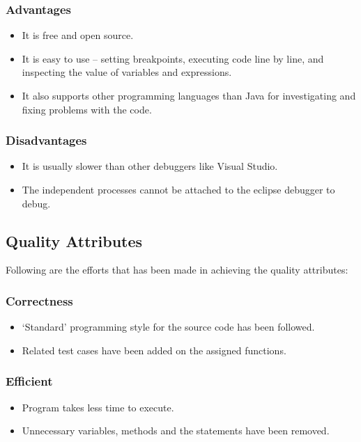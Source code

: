 \documentclass[a4paper,12pt]{article}
\begin{document}
    \subsubsection{Advantages}
    \begin{itemize}
        \item It is free and open source.
        \item It is easy to use – setting breakpoints, executing code line by line, and inspecting the value of variables and expressions.
        \item It also supports other programming languages than Java for investigating and fixing problems with the code.
    \end{itemize}
    \subsubsection{Disadvantages}
    \begin{itemize}
        \item It is usually slower than other debuggers like Visual Studio.
        \item The independent processes cannot be attached to the eclipse debugger to debug.
    \end{itemize}
    
    \newpage
    
    \subsection{Quality Attributes}
    Following are the efforts that has been made in achieving the quality attributes:
    \subsubsection{Correctness}
    \begin{itemize}
        \item ‘Standard’ programming style for the source code has been followed.
        \item Related test cases have been added on the assigned functions.
    \end{itemize}
    
    \subsubsection{Efficient}
    \begin{itemize}
        \item Program takes less time to execute.
        \item Unnecessary variables, methods and the statements have been removed.
    \end{itemize}
    
\end{document}
